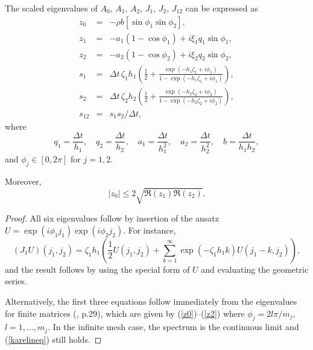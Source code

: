 {\begin{lemma}
The scaled eigenvalues of $A_0$, $A_1$, $A_2$, $J_1$, $J_2$, $J_{12}$ can be expressed as
\begin{eqnarray}
\label{z0}
	z_0 &=& -\rho b [\sin{\phi_1} \sin{\phi_2}],  \\
	\label{z1}
	z_1 &=& -a_1 (1 - \cos{\phi_1}) + i \xi_1 q_1 \sin{\phi_1}, \\
	\label{z2}
	z_2 &=& -a_2 (1 - \cos{\phi_2}) + i \xi_2 q_2 \sin{\phi_2}, \\
	s_1 &=& \Delta t \, \zeta_1 h_1 \left(\frac{1}{2} + \frac{\exp(-h_1 \zeta_1 + i \phi_1)}{1-\exp(-h_1 \zeta_1 + i \phi_1)} \right), \\
	s_2 &=& \Delta t \, \zeta_2 h_2 \left(\frac{1}{2} + \frac{\exp(-h_2 \zeta_2 + i \phi_2)}{1-\exp(-h_2 \zeta_2 + i \phi_2)} \right), \\
	s_{12} &=& s_1 s_2/\Delta t,
\end{eqnarray}
where
\begin{equation*}
	q_1 = \frac{\Delta t}{h_1}, \quad q_2 = \frac{\Delta t}{h_2}, \quad a_1 = \frac{\Delta t}{h_1^2}, \quad a_2 = \frac{\Delta t}{h_2^2}, \quad b= \frac{\Delta t}{h_1 h_2},
\end{equation*}
and $\phi_j \in [0, 2 \pi]$ for $j = 1, 2$.

Moreover,
\begin{equation}
\label{karelineq}
	|z_0| \le 2 \sqrt{\Re(z_1) \Re(z_2)}.
\end{equation}	
\end{lemma}
\begin{proof}
	All six eigenvalues follow by insertion of the ansatz $U=\exp(i \phi_1 j_1) \exp(i \phi_2 j_2)$.
	For instance, %
	\[
	(J_1 U)(j_1,j_2) = \zeta_1 h_1 \left(\frac{1}{2} U(j_1,j_2) +  \sum_{k=1}^\infty \exp(-\zeta_1 h_1 k) U(j_1-k,j_2) \right),
	\]
	and the result follows by using the special form of $U$ and evaluating the geometric series.
	
	Alternatively, the first three equations follow immediately from the eigenvalues for finite matrices (\cite{intHoutStability}, p.29),
	which are given by (\ref{z0})--(\ref{z2}) where $\phi_j = 2 l \pi/m_j$, $l=1,\ldots,m_j$.
	In the infinite mesh case, the spectrum is the continuous limit and (\ref{karelineq}) still holds.
\end{proof}


}
